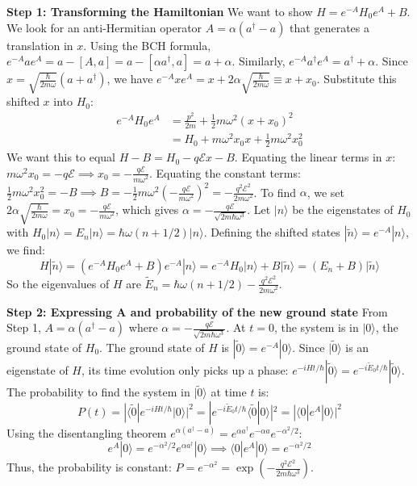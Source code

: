 \begin{solution}
\textbf{Step 1: Transforming the Hamiltonian}
We want to show $H = e^{-A} H_0 e^A + B$. We look for an anti-Hermitian operator $A = \alpha(a^\dagger - a)$ that generates a translation in $x$.
Using the BCH formula, $e^{-A} a e^A = a - [A, a] = a - [\alpha a^\dagger, a] = a + \alpha$.
Similarly, $e^{-A} a^\dagger e^A = a^\dagger + \alpha$.
Since $x = \sqrt{\frac{\hbar}{2m\omega}}(a + a^\dagger)$, we have $e^{-A} x e^A = x + 2\alpha \sqrt{\frac{\hbar}{2m\omega}} \equiv x + x_0$.
Substitute this shifted $x$ into $H_0$:
\[ \begin{aligned}
    e^{-A} H_0 e^A &= \frac{p^2}{2m} + \frac{1}{2}m\omega^2 (x + x_0)^2 \\
                   &= H_0 + m\omega^2 x_0 x + \frac{1}{2}m\omega^2 x_0^2
\end{aligned} \]
We want this to equal $H - B = H_0 - q\mathcal{E}x - B$.
Equating the linear terms in $x$: $m\omega^2 x_0 = -q\mathcal{E} \implies x_0 = -\frac{q\mathcal{E}}{m\omega^2}$.
Equating the constant terms: $\frac{1}{2}m\omega^2 x_0^2 = -B \implies B = -\frac{1}{2}m\omega^2 \left( -\frac{q\mathcal{E}}{m\omega^2} \right)^2 = -\frac{q^2\mathcal{E}^2}{2m\omega^2}$.
To find $\alpha$, we set $2\alpha \sqrt{\frac{\hbar}{2m\omega}} = x_0 = -\frac{q\mathcal{E}}{m\omega^2}$, which gives $\alpha = -\frac{q\mathcal{E}}{\sqrt{2m\hbar\omega^3}}$.
Let $|n\rangle$ be the eigenstates of $H_0$ with $H_0|n\rangle = E_n|n\rangle = \hbar\omega(n+1/2)|n\rangle$.
Defining the shifted states $|\tilde{n}\rangle = e^{-A}|n\rangle$, we find:
\[ H |\tilde{n}\rangle = (e^{-A} H_0 e^A + B) e^{-A} |n\rangle = e^{-A} H_0 |n\rangle + B |\tilde{n}\rangle = (E_n + B) |\tilde{n}\rangle \]
So the eigenvalues of $H$ are $\tilde{E}_n = \hbar\omega(n+1/2) - \frac{q^2\mathcal{E}^2}{2m\omega^2}$.

\textbf{Step 2: Expressing A and probability of the new ground state}
From Step 1, $A = \alpha(a^\dagger - a)$ where $\alpha = -\frac{q\mathcal{E}}{\sqrt{2m\hbar\omega^3}}$.
At $t=0$, the system is in $|0\rangle$, the ground state of $H_0$. The ground state of $H$ is $|\tilde{0}\rangle = e^{-A}|0\rangle$.
Since $|\tilde{0}\rangle$ is an eigenstate of $H$, its time evolution only picks up a phase: $e^{-iHt/\hbar}|\tilde{0}\rangle = e^{-i\tilde{E}_0 t/\hbar}|\tilde{0}\rangle$.
The probability to find the system in $|\tilde{0}\rangle$ at time $t$ is:
\[ P(t) = | \langle \tilde{0} | e^{-iHt/\hbar} | 0 \rangle |^2 = | e^{-i\tilde{E}_0 t/\hbar} \langle \tilde{0} | 0 \rangle |^2 = | \langle 0 | e^A | 0 \rangle |^2 \]
Using the disentangling theorem $e^{\alpha(a^\dagger - a)} = e^{\alpha a^\dagger} e^{-\alpha a} e^{-\alpha^2/2}$:
\[ e^A |0\rangle = e^{-\alpha^2/2} e^{\alpha a^\dagger} |0\rangle \implies \langle 0 | e^A | 0 \rangle = e^{-\alpha^2/2} \]
Thus, the probability is constant: $P = e^{-\alpha^2} = \exp\left( - \frac{q^2\mathcal{E}^2}{2m\hbar\omega^3} \right)$.


\end{solution}

